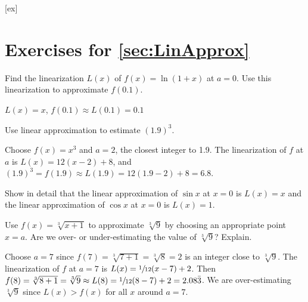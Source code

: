 [ex]
\section*{Exercises for \ref{sec:LinApprox}}

\begin{enumialphparenastyle}

\begin{ex} 
Find the linearization $L(x)$ of $f(x)=\ln (1+x)$ at $a=0$. Use
this linearization to approximate $f(0.1)$.
\begin{sol}
$L(x)=x$, $f(0.1)\approx L(0.1)=0.1$
\end{sol}
\end{ex}

\begin{ex} 
Use linear approximation to estimate $(1.9)^3$.
\begin{sol}
Choose $f(x)=x^3$ and $a=2$, the closest integer to 1.9. The
linearization of $f$ at $a$ is $L(x)=12(x-2)+8$, and $(1.9)^3=f(1.9)\approx L(1.9)=12(1.9-2)+8=6.8$.
\end{sol}
\end{ex}

\begin{ex} 
Show in detail that the linear approximation of
$\sin x$ at $x=0$ is $L(x)=x$ and the linear approximation of $\cos x$
at $x=0$ is $L(x)=1$.
\end{ex}

\begin{ex} 
Use $f(x)=\sqrt[3]{x+1}$ to approximate $\sqrt[3]{9}$ by choosing an
appropriate point $x=a$. Are we over- or under-estimating the value of $\sqrt[3]{9}$? Explain.
\begin{sol}
Choose $a=7$ since $f(7)=\sqrt[3]{7+1}=\sqrt[3]{8}=2$ is an integer
close to $\sqrt[3]{9}$. The linearization of $f$ at $a=7$ is
$L(x)=\sfrac{1}{12}(x-7)+2$. Then $f(8)=\sqrt[3]{8+1}=\sqrt[3]{9}\approx L(8)=\sfrac{1}{12}(8-7)+2=2.08\bar{3}$. We are over-estimating $\sqrt[3]{9}$ since $L(x)>f(x)$ for all $x$ around $a=7$.
\end{sol}
\end{ex}

\end{enumialphparenastyle}